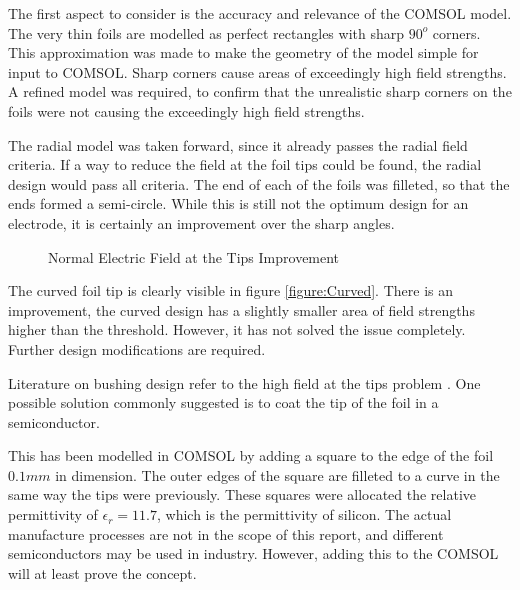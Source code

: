 The first aspect to consider is the accuracy and relevance of the COMSOL model.
The very thin foils are modelled as perfect rectangles with sharp $90^{o}$ corners.
This approximation was made to make the geometry of the model simple for input to COMSOL.
Sharp corners cause areas of exceedingly high field strengths. 
A refined model was required, to confirm that the unrealistic sharp corners on the foils were not causing the exceedingly high field strengths.

The radial model was taken forward, since it already passes the radial field criteria.
If a way to reduce the field at the foil tips could be found, the radial design would pass all criteria.
The end of each of the foils was filleted, so that the ends formed a semi-circle.
While this is still not the optimum design for an electrode, it is certainly an improvement over the sharp angles.

\begin{figure}[!h]
\centering
{}
\caption{Normal Electric Field at the Tips Improvement}
\label{figure:curvedcompare}
\end{figure}

The curved foil tip is clearly visible in figure \ref{figure:Curved}.
There is an improvement, the curved design has a slightly smaller area of field strengths higher than the threshold.
However, it has not solved the issue completely.
Further design modifications are required.

Literature on bushing design refer to the high field at the tips problem \cite{kuffel2000high}.
One possible solution commonly suggested is to coat the tip of the foil in a semiconductor.

This has been modelled in COMSOL by adding a square to the edge of the foil $0.1mm$ in dimension. 
The outer edges of the square are filleted to a curve in the same way the tips were previously.
These squares were allocated the relative permittivity of $\epsilon_r = 11.7$, which is the permittivity of silicon.
The actual manufacture processes are not in the scope of this report, and different semiconductors may be used in industry.
However, adding this to the COMSOL will at least prove the concept.

